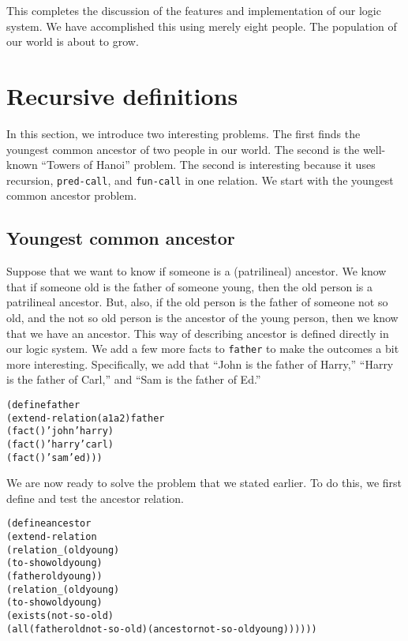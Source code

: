 This completes the discussion of the features and implementation of
our logic system.  We have accomplished this using merely eight
people.  The population of our world is about to grow.

\section{Recursive definitions}

In this section, we introduce two interesting problems.  The first
finds the youngest common ancestor of two people in our world.  The
second is the well-known ``Towers of Hanoi'' problem.  The second 
is interesting because it uses recursion, \texttt{pred-call}, and
\texttt{fun-call} in one relation.  We start with the youngest common
ancestor problem.

\subsection{Youngest common ancestor}

Suppose that we want to know if someone is a (patrilineal) ancestor.
We know that if someone old is the father of someone young, then the
old person is a patrilineal ancestor.  But, also, if the old person is
the father of someone not so old, and the not so old person is the
ancestor of the young person, then we know that we have an ancestor.
This way of describing ancestor is defined directly in our logic
system.  We add a few more facts to \texttt{father} to make the
outcomes a bit more interesting.  Specifically, we add that ``John is
the father of Harry,'' ``Harry is the father of Carl,'' and ``Sam is the
father of Ed.''

\begin{alltt}
(define father
  (extend-relation (a1 a2) father
    (fact () 'john 'harry)
    (fact () 'harry 'carl)
    (fact () 'sam 'ed)))
\end{alltt}

We are now ready to solve the problem that we stated earlier.  To do
this, we first define and test the ancestor relation.

\begin{alltt}
(define ancestor
  (extend-relation
    (relation _ (old young)
      (to-show old young)
      (father old young))
    (relation _ (old young)
      (to-show old young)
      (exists (not-so-old)
        (all (father old not-so-old) (ancestor not-so-old young))))))
\end{alltt}

